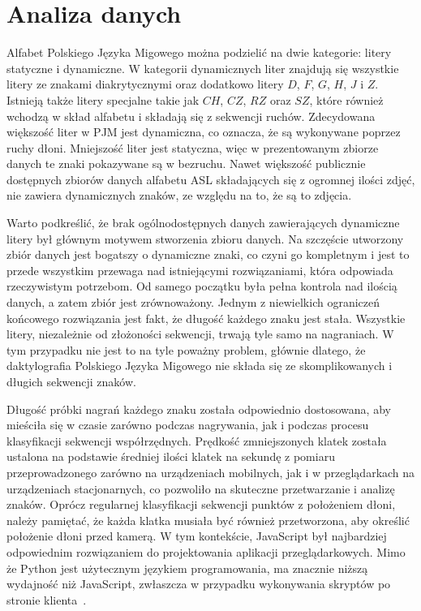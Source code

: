 \section{Analiza danych}
\label{sec:data-analysis}

Alfabet Polskiego Języka Migowego można podzielić na dwie kategorie: litery statyczne i dynamiczne. W kategorii dynamicznych liter znajdują się wszystkie litery ze znakami diakrytycznymi oraz dodatkowo litery $D$, $F$, $G$, $H$, $J$ i $Z$. Istnieją także litery specjalne takie jak $CH$, $CZ$, $RZ$ oraz $SZ$, które również wchodzą w skład alfabetu i składają się z sekwencji ruchów. Zdecydowana większość liter w PJM jest dynamiczna, co oznacza, że są wykonywane poprzez ruchy dłoni. Mniejszość liter jest statyczna, więc w prezentowanym zbiorze danych te znaki pokazywane są w bezruchu. Nawet większość publicznie dostępnych zbiorów danych alfabetu ASL składających się z ogromnej ilości zdjęć, nie zawiera dynamicznych znaków, ze względu na to, że są to zdjęcia.

Warto podkreślić, że brak ogólnodostępnych danych zawierających dynamiczne litery był głównym motywem stworzenia zbioru danych. Na szczęście utworzony zbiór danych jest bogatszy o dynamiczne znaki, co czyni go kompletnym i jest to przede wszystkim przewaga nad istniejącymi rozwiązaniami, która odpowiada rzeczywistym potrzebom. Od samego początku była pełna kontrola nad ilością danych, a zatem zbiór jest zrównoważony. Jednym z niewielkich ograniczeń końcowego rozwiązania jest fakt, że długość każdego znaku jest stała. Wszystkie litery, niezależnie od złożoności sekwencji, trwają tyle samo na nagraniach. W tym przypadku nie jest to na tyle poważny problem, głównie dlatego, że daktylografia Polskiego Języka Migowego nie składa się ze skomplikowanych i długich sekwencji znaków.

Długość próbki nagrań każdego znaku została odpowiednio dostosowana, aby mieściła się w czasie zarówno podczas nagrywania, jak i podczas procesu klasyfikacji sekwencji współrzędnych. Prędkość zmniejszonych klatek została ustalona na podstawie średniej ilości klatek na sekundę z pomiaru przeprowadzonego zarówno na urządzeniach mobilnych, jak i w przeglądarkach na urządzeniach stacjonarnych, co pozwoliło na skuteczne przetwarzanie i analizę znaków. Oprócz regularnej klasyfikacji sekwencji punktów z położeniem dłoni, należy pamiętać, że każda klatka musiała być również przetworzona, aby określić położenie dłoni przed kamerą. W tym kontekście, JavaScript był najbardziej odpowiednim rozwiązaniem do projektowania aplikacji przeglądarkowych. Mimo że Python jest użytecznym językiem programowania, ma znacznie niższą wydajność niż JavaScript, zwłaszcza w przypadku wykonywania skryptów po stronie klienta~\cite{lei2014}.

